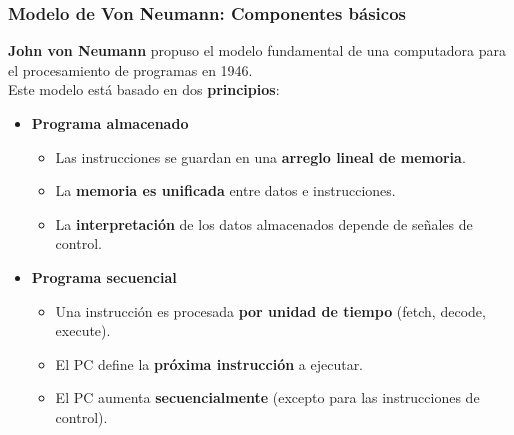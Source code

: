\documentclass[aspectratio=169]{beamer}
\begin{document}
\begin{frame}[t,fragile]
    \frametitle{Modelo de Von Neumann: Componentes básicos}
    \textbf{John von Neumann} propuso el modelo fundamental de una computadora para el procesamiento de programas en 1946.\\
    \bigskip
    \pause
    \textcolor{verdeuca}{Este modelo está basado en dos \textbf{principios}:}
    \begin{itemize}
    \item<2-> \textbf{Programa almacenado}\\
    \begin{itemize}
     \item Las instrucciones se guardan en una \textcolor{verdeuca}{\textbf{arreglo lineal de memoria}}.
     \item La \textcolor{verdeuca}{\textbf{memoria es unificada}} entre datos e instrucciones. 
     \item La \textcolor{verdeuca}{\textbf{interpretación}} de los datos almacenados depende de señales de control.
    \end{itemize}
    \item<3-> \textbf{Programa secuencial}\\
    \begin{itemize}
     \item Una instrucción es procesada \textcolor{verdeuca}{\textbf{por unidad de tiempo}} (fetch, decode, execute).
     \item El PC define la \textcolor{verdeuca}{\textbf{próxima instrucción}} a ejecutar.
     \item El PC aumenta \textcolor{verdeuca}{\textbf{secuencialmente}} (excepto para las instrucciones de control).
    \end{itemize}
    \end{itemize}
    \bigskip
\end{frame}
\end{document}
